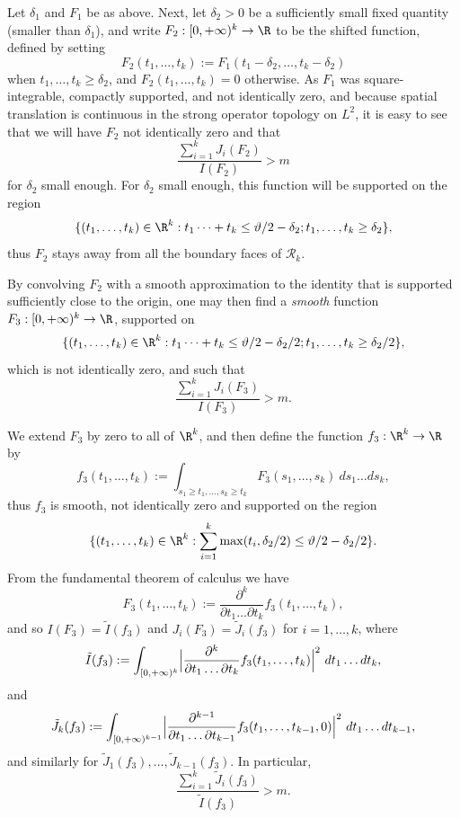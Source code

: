 Let $\delta_1$ and $F_1$ be as above. Next, let $\delta_2 > 0$ be a sufficiently small fixed quantity (smaller than $\delta_1$), and write $F_2: [0,+\infty)^k \to \R$ to be the shifted function, defined by setting
$$ F_2(t_1,\dots,t_k) := F_1( t_1-\delta_2, \dots, t_k-\delta_2 )$$
when $t_1,\dots,t_k \geq \delta_2$, and $F_2(t_1,\dots,t_k)=0$ otherwise.
As $F_1$ was square-integrable, compactly supported, and not identically zero, and because spatial translation is continuous in the strong operator topology on $L^2$, it is easy to see that we will have $F_2$ not identically zero and that
\begin{equation}\label{jbig-3}
 \frac{\sum_{i=1}^k J_i(F_2)}{I(F_2)} > m
\end{equation}
for $\delta_2$ small enough.  For $\delta_2$ small enough, this function will be supported on the region
$$
\{ (t_1,\dots,t_k) \in \R^k: t_1 \dots + t_k \leq \vartheta/2-\delta_2; t_1,\dots,t_k \geq \delta_2 \},$$
thus $F_2$ stays away from all the boundary faces of ${\mathcal R}_k$.

By convolving $F_2$ with a smooth approximation to the identity that is supported sufficiently close to the origin, one may then find a \emph{smooth} function $F_3: [0,+\infty)^k \to \R$, supported on
$$
\{ (t_1,\dots,t_k) \in \R^k: t_1 \dots + t_k \leq \vartheta/2-\delta_2/2; t_1,\dots,t_k \geq \delta_2/2 \},$$
which is not identically zero, and such that
\begin{equation}\label{jbig-4}
 \frac{\sum_{i=1}^k J_i(F_3)}{I(F_3)} > m.
\end{equation}

We extend $F_3$ by zero to all of $\R^k$, and then define the function $f_3: \R^k \to \R$ by
$$ f_3(t_1,\dots,t_k) := \int_{s_1 \geq t_1, \dots, s_k \geq t_k} F_3(s_1,\dots,s_k)\ ds_1 \dots ds_k,$$
thus $f_3$ is smooth, not identically zero and supported on the region
\begin{equation}\label{f3reg}
 \{ (t_1,\dots,t_k) \in \R^k: \sum_{i=1}^k \max(t_i, \delta_2/2) \leq \vartheta/2 - \delta_2/2 \}.
\end{equation}
From the fundamental theorem of calculus we have
\begin{equation}\label{ftj}
 F_3(t_1,\dots,t_k) := \frac{\partial^k}{\partial t_1 \dots \partial t_k} f_3(t_1,\dots,t_k),
\end{equation}
and so $I(F_3) = \tilde I(f_3)$ and $J_i(F_3) = \tilde J_i(f_3)$ for $i=1,\dots,k$, where
\begin{equation}\label{tidef}
 \tilde I(f_3) := \int_{[0,+\infty)^k} \Bigl|\frac{\partial^k}{\partial t_1 \dots \partial t_k} f_3(t_1,\dots,t_k)\Bigr|^2\ dt_1 \dots dt_k,
\end{equation}
and
\begin{equation}\label{tjdef}
 \tilde J_k(f_3) := \int_{[0,+\infty)^{k-1}} \Bigl|\frac{\partial^{k-1}}{\partial t_1 \dots \partial t_{k-1}} f_3(t_1,\dots,t_{k-1},0)\Bigr|^2\ dt_1 \dots dt_{k-1},
\end{equation}
and similarly for $\tilde{J}_1(f_3),\dots,\tilde{J}_{k-1}(f_3)$. In particular, 
\begin{equation}\label{jbig-5}
 \frac{\sum_{i=1}^k \tilde J_i(f_3)}{\tilde I(f_3)} > m.
\end{equation}

